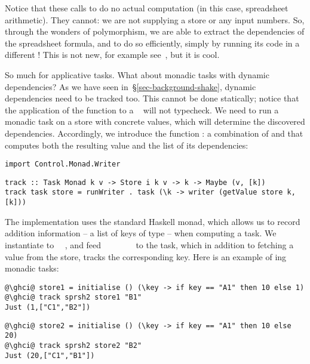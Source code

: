 \noindent
Notice that these calls to  do no actual computation (in this
case, spreadsheet arithmetic). They cannot: we are not supplying a store or any
input numbers. So, through the wonders of polymorphism, we are able to extract
the dependencies of the spreadsheet formula, and to do so efficiently, simply by
running its code in a different ! This is not new, for example
see~\cite{free-applicatives}, but it is cool.

So much for applicative tasks. What about monadic tasks with dynamic
dependencies? As we have seen in~\S\ref{sec-background-shake}, dynamic
dependencies need to be tracked too. This cannot be done statically; notice that
the application of the function  to a ~ will
not typecheck. We need to run a monadic task on a store with concrete values,
which will determine the discovered dependencies. Accordingly, we introduce
the function : a combination of  and 
that computes both the resulting value and the list of its dependencies:

\vspace{1mm}
\begin{verbatim}
import Control.Monad.Writer
\end{verbatim}
\vspace{0.5mm}
\begin{verbatim}
track :: Task Monad k v -> Store i k v -> k -> Maybe (v, [k])
track task store = runWriter . task (\k -> writer (getValue store k, [k]))
\end{verbatim}
\vspace{1mm}

\noindent
The implementation uses the standard Haskell  monad, which allows us
to record addition information -- a list of keys of type \hs{[@@k]} -- when
computing a task. We instantiate  to ~\hs{[@@k]}~, and feed
~~\hs{=}~~~~~\hs{[@@k])}
to the task, which in addition to fetching a value from the store, tracks the
corresponding key. Here is an example of ing monadic tasks:

\vspace{1mm}
\begin{verbatim}
@\ghci@ store1 = initialise () (\key -> if key == "A1" then 10 else 1)
@\ghci@ track sprsh2 store1 "B1"
Just (1,["C1","B2"])
\end{verbatim}
\vspace{1mm}
\begin{verbatim}
@\ghci@ store2 = initialise () (\key -> if key == "A1" then 10 else 20)
@\ghci@ track sprsh2 store2 "B2"
Just (20,["C1","B1"])
\end{verbatim}
\vspace{1mm}

